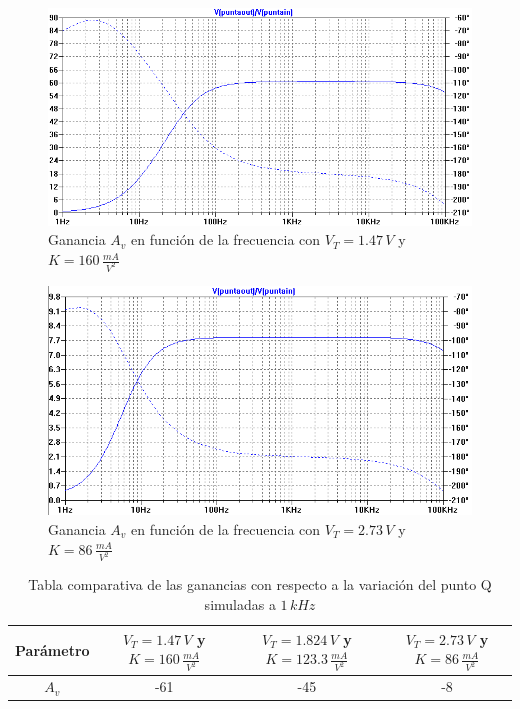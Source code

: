 \documentclass[10pt,spanish,a4paper,notitlepage]{article}
\begin{document}
\begin{figure}[H]
\centering
\includegraphics[scale=0.7]{simulaciones/A_acAvmax.png}
\caption{Ganancia $A_v$ en función de la frecuencia con $V_{T}=1.47\,\unit{V}$ y $K=160\,\unit{\frac{mA}{V^2}}$ }
\label{fig:A_acAvmax}
\end{figure}

\begin{figure}[H]
\centering
\includegraphics[scale=0.7]{simulaciones/A_acAvmin.png}
\caption{Ganancia $A_v$ en función de la frecuencia con $V_{T}=2.73\,\unit{V}$ y $K=86\,\unit{\frac{mA}{V^2}}$}
\label{fig:A_acAvmin}
\end{figure}

\begin{table}[H]
\centering
\begin{tabular}{|c|c|c|c|} %
\hline
Parámetro & $V_{T}=1.47\,\unit{V}$ y $K=160\,\unit{\frac{mA}{V^2}}$ & $V_{T}=1.824\,\unit{V}$ y $K=123.3\,\unit{\frac{mA}{V^2}}$ & $V_{T}=2.73\,\unit{V}$ y $K=86\,\unit{\frac{mA}{V^2}}$  \\ \hline
$A_v$ & -61 & -45 & -8   \\ \hline
\end{tabular}
\caption{Tabla comparativa de las ganancias con respecto a la variación del punto Q simuladas a $1\,\unit{kHz}$  }
\label{table:tabla_AvQ_simu}
\end{table}
\end{document}
